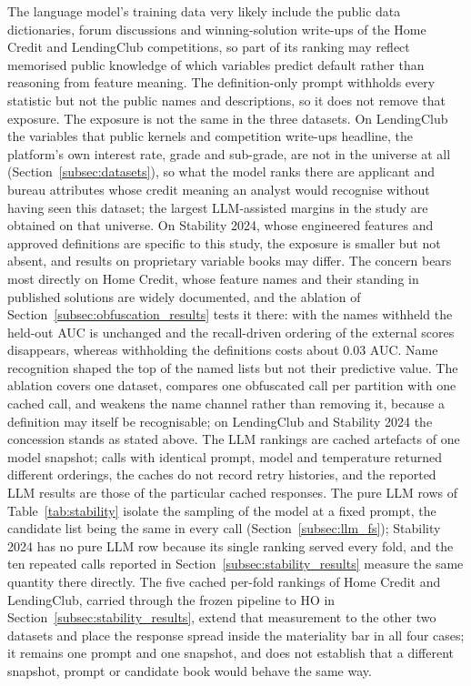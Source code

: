 \documentclass[final,5p,twocolumn]{elsarticle}
\begin{document}
The language model's training data very likely include the public data dictionaries, forum discussions and winning-solution write-ups of the Home Credit and LendingClub competitions, so part of its ranking may reflect memorised public knowledge of which variables predict default rather than reasoning from feature meaning. The definition-only prompt withholds every statistic but not the public names and descriptions, so it does not remove that exposure. The exposure is not the same in the three datasets. On LendingClub the variables that public kernels and competition write-ups headline, the platform's own interest rate, grade and sub-grade, are not in the universe at all (Section~\ref{subsec:datasets}), so what the model ranks there are applicant and bureau attributes whose credit meaning an analyst would recognise without having seen this dataset; the largest LLM-assisted margins in the study are obtained on that universe. On Stability 2024, whose engineered features and approved definitions are specific to this study, the exposure is smaller but not absent, and results on proprietary variable books may differ. The concern bears most directly on Home Credit, whose feature names and their standing in published solutions are widely documented, and the ablation of Section~\ref{subsec:obfuscation_results} tests it there: with the names withheld the held-out AUC is unchanged and the recall-driven ordering of the external scores disappears, whereas withholding the definitions costs about 0.03 AUC. Name recognition shaped the top of the named lists but not their predictive value. The ablation covers one dataset, compares one obfuscated call per partition with one cached call, and weakens the name channel rather than removing it, because a definition may itself be recognisable; on LendingClub and Stability 2024 the concession stands as stated above. The LLM rankings are cached artefacts of one model snapshot; calls with identical prompt, model and temperature returned different orderings, the caches do not record retry histories, and the reported LLM results are those of the particular cached responses. The pure LLM rows of Table~\ref{tab:stability} isolate the sampling of the model at a fixed prompt, the candidate list being the same in every call (Section~\ref{subsec:llm_fs}); Stability 2024 has no pure LLM row because its single ranking served every fold, and the ten repeated calls reported in Section~\ref{subsec:stability_results} measure the same quantity there directly. The five cached per-fold rankings of Home Credit and LendingClub, carried through the frozen pipeline to HO in Section~\ref{subsec:stability_results}, extend that measurement to the other two datasets and place the response spread inside the materiality bar in all four cases; it remains one prompt and one snapshot, and does not establish that a different snapshot, prompt or candidate book would behave the same way.
\end{document}
